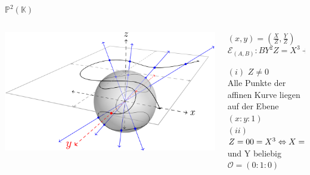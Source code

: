 \begin{frame}{$\mathbb{P}^2(\mathbb{K})$}
    \begin{columns}
        \begin{column}{0.6\textwidth}
            \includegraphics[width=\linewidth]{img/p^2.png}
        \end{column}
        \begin{column}{0.5\textwidth}
            \((x, y) = \left( \frac{X}{Z}, \frac{Y}{Z} \right)\)
            \[\mathcal{E}_{(A,B)}:BY^2Z=X^3+AX^2Z+XZ^2\subseteq\mathbb{P}^2\]
            \begin{algorithmblock}
                $(i)$ $Z\neq0$ \\ 
                \quad Alle Punkte der affinen Kurve liegen auf der Ebene $(x : y : 1)$\\
                $(ii)$ $Z=0\\0=X^3\Leftrightarrow X=0$ und Y beliebig\\$\mathcal{O}=(0:1:0)$
            \end{algorithmblock}
        \end{column}    
    \end{columns}
\end{frame}
